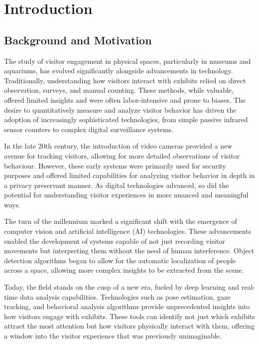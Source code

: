 \section{Introduction}


\subsection{Background and Motivation}
The study of visitor engagement in physical spaces, particularly in museums and aquariums, has evolved significantly alongside advancements in technology. Traditionally, understanding how visitors interact with exhibits relied on direct observation, surveys, and manual counting. These methods, while valuable, offered limited insights and were often labor-intensive and prone to biases. The desire to quantitatively measure and analyze visitor behavior has driven the adoption of increasingly sophisticated technologies, from simple passive infrared sensor counters to complex digital surveillance systems.

In the late 20th century, the introduction of video cameras provided a new avenue for tracking visitors, allowing for more detailed observations of visitor behaviour. However, these early systems were primarily used for security purposes and offered limited capabilities for analyzing visitor behavior in depth in a privacy preservant manner. As digital technologies advanced, so did the potential for understanding visitor experiences in more nuanced and meaningful ways.

The turn of the millennium marked a significant shift with the emergence of computer vision and artificial intelligence (AI) technologies. These advancements enabled the development of systems capable of not just recording visitor movements but interpreting them without the need of human interference. Object detection algorithms began to allow for the automatic localization of people across a space, allowing more complex insights to be extracted from the scene.

Today, the field stands on the cusp of a new era, fueled by deep learning and real-time data analysis capabilities. Technologies such as pose estimation, gaze tracking, and behavioral analysis algorithms provide unprecedented insights into how visitors engage with exhibits. These tools can identify not just which exhibits attract the most attention but how visitors physically interact with them, offering a window into the visitor experience that was previously unimaginable.

